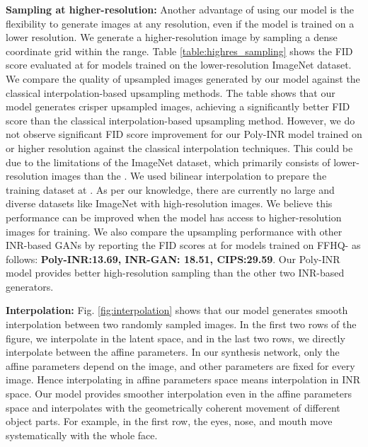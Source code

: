 \noindent\textbf{Sampling at higher-resolution:}
Another advantage of using our model is the flexibility to generate images at any resolution, even if the model is trained on a lower resolution. We generate a higher-resolution image by sampling a dense coordinate grid within the  range. Table \ref{table:highres_sampling} shows the FID score evaluated at  for models trained on the lower-resolution ImageNet dataset. We compare the quality of upsampled images generated by our model against the classical interpolation-based upsampling methods. The table shows that our model generates crisper upsampled images, achieving a significantly better FID score than the classical interpolation-based upsampling method. However, we do not observe significant FID score improvement for our Poly-INR model trained on  or higher resolution against the classical interpolation techniques. This could be due to the limitations of the ImageNet dataset, which primarily consists of lower-resolution images than the . We used bilinear interpolation to prepare the training dataset at . As per our knowledge, there are currently no large and diverse datasets like ImageNet with high-resolution images. We believe this performance can be improved when the model has access to higher-resolution images for training. We also compare the upsampling performance with other INR-based GANs by reporting the FID scores at  for models trained on FFHQ- as follows: \textbf{Poly-INR:13.69, INR-GAN: 18.51, CIPS:29.59}. Our Poly-INR model provides better high-resolution sampling than the other two INR-based generators.


\noindent\textbf{Interpolation:}
Fig. \ref{fig:interpolation} shows that our model generates smooth interpolation between two randomly sampled images. In the first two rows of the figure, we interpolate in the latent space, and in the last two rows, we directly interpolate between the affine parameters. In our synthesis network, only the affine parameters depend on the image, and other parameters are fixed for every image. Hence interpolating in affine parameters space means interpolation in INR space. Our model provides smoother interpolation even in the affine parameters space and interpolates with the geometrically coherent movement of different object parts. For example, in the first row, the eyes, nose, and mouth move systematically with the whole face. 

